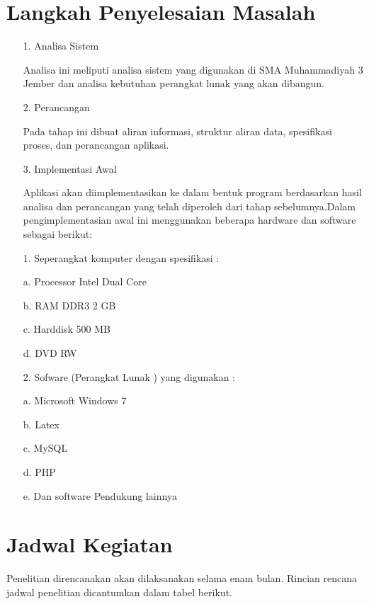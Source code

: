\documentclass{jtetiproposalskripsi}
\begin{document}
\section{Langkah Penyelesaian Masalah}
\begin{itemize}
\item[1.]Analisa Sistem

Analisa ini meliputi analisa sistem yang digunakan di SMA Muhammadiyah 3 Jember dan analisa kebutuhan perangkat lunak yang akan dibangun.
\item[2.]Perancangan 

Pada  tahap  ini  dibuat  aliran  informasi,  struktur  aliran  data,  spesifikasi proses, dan perancangan aplikasi.
\item[3.]Implementasi Awal

Aplikasi  akan  diimplementasikan  ke  dalam  bentuk  program  berdasarkan hasil  analisa  dan  perancangan  yang  telah  diperoleh  dari  tahap  sebelumnya.Dalam  pengimplementasian  awal  ini  menggunakan  beberapa  hardware  dan software  sebagai berikut:
\item[1.]Seperangkat komputer dengan spesifikasi :

\item[a.]Processor Intel Dual Core
\item[b.]RAM DDR3 2 GB
\item[c.]Harddisk 500 MB
\item[d.]DVD RW 

\item[2.]Sofware (Perangkat Lunak ) yang digunakan :
\item[a.]Microsoft Windows 7
\item[b.]Latex 
\item[c.]MySQL
\item[d.]PHP
\item[e.]Dan software Pendukung lainnya

\end{itemize}

\newpage

\section{Jadwal Kegiatan}
Penelitian direncanakan akan dilaksanakan selama enam bulan. Rincian rencana jadwal penelitian dicantumkan dalam tabel berikut.
\end{document}
